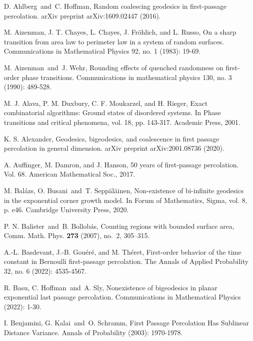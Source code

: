 \documentclass[11pt, reqno]{amsart}
\numberwithin{equation}{section}
\begin{document}
\begin{thebibliography}{}

D. Ahlberg\ and\ C. Hoffman, Random coalescing geodesics in first-passage percolation. arXiv preprint arXiv:1609.02447 (2016).

M. Aizenman, J. T. Chayes, L. Chayes, J. Fröhlich, and L. Russo, On a sharp transition from area law to perimeter law in a system of random surfaces. Communications in Mathematical Physics 92, no. 1 (1983): 19-69.

M. Aizenman\ and\ J. Wehr, Rounding effects of quenched randomness on first-order phase transitions. Communications in mathematical physics 130, no. 3 (1990): 489-528.

M. J. Alava, P. M. Duxbury, C. F. Moukarzel, and H. Rieger, Exact combinatorial algorithms: Ground states of disordered systems. In Phase transitions and critical phenomena, vol. 18, pp. 143-317. Academic Press, 2001.

K. S. Alexander, Geodesics, bigeodesics, and coalescence in first passage percolation in general dimension. arXiv preprint arXiv:2001.08736 (2020).

A. Auffinger, M. Damron, and J. Hanson, 50 years of first-passage percolation. Vol. 68. American Mathematical Soc., 2017.

M. Bal\'azs, O. Busani\ and\ T. Sepp\"al\"ainen, Non-existence of bi-infinite geodesics in the exponential corner growth model. In Forum of Mathematics, Sigma, vol. 8, p. e46. Cambridge University Press, 2020.

P. N. Balister\ and\ B. Bollob\'{a}s, Counting regions with bounded surface area, Comm. Math. Phys. {\bf 273} (2007), no.~2, 305--315. 

A.-L. Basdevant, J.-B. Gou\'er\'e, and M. Th\'eret, First-order behavior of the time constant in Bernoulli first-passage percolation. The Annals of Applied Probability 32, no. 6 (2022): 4535-4567.

R. Basu, C. Hoffman\ and\ A. Sly, Nonexistence of bigeodesics in planar exponential last passage percolation. Communications in Mathematical Physics (2022): 1-30.

I. Benjamini, G. Kalai\ and\ O. Schramm, First Passage Percolation Has Sublinear Distance Variance. Annals of Probability (2003): 1970-1978.


\end{thebibliography}
\end{document}
